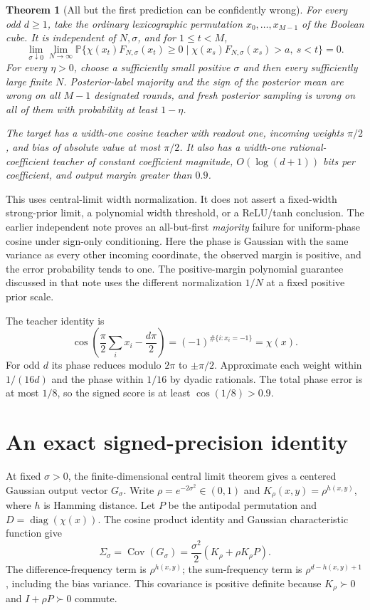 \documentclass[11pt]{article}
\newtheorem{theorem}{Theorem}
\newcommand{\Pp}{\mathbb P}\newcommand{\one}{\mathbf1}
\begin{document}
\begin{theorem}[All but the first prediction can be confidently wrong]
\label{thm:main}
For every odd $d\ge1$, take the ordinary lexicographic permutation
$x_0,\ldots,x_{M-1}$ of the Boolean cube. It is independent of
$N,\sigma$, and for $1\le t<M$,
\[
 \lim_{\sigma\downarrow0}\lim_{N\to\infty}
 \Pp\{\chi(x_t)F_{N,\sigma}(x_t)\ge0\mid
       \chi(x_s)F_{N,\sigma}(x_s)>a,\ s<t\}=0.             \tag{2}
\]
For every $\eta>0$, choose a sufficiently small positive
$\sigma$ and then every sufficiently large finite $N$.
Posterior-label majority and the sign of the posterior mean are wrong
on all $M-1$ designated rounds,
and fresh posterior sampling is wrong on all of them with probability
at least $1-\eta$.

The target has a width-one cosine teacher with readout one, incoming
weights $\pi/2$, and bias of absolute value at most $\pi/2$.
It also has a width-one rational-coefficient teacher of constant
coefficient magnitude, $O(\log(d+1))$ bits per coefficient, and output
margin greater than $0.9$.
\end{theorem}

This uses central-limit width normalization. It does not assert a
fixed-width strong-prior limit, a polynomial width threshold, or a
ReLU/tanh conclusion. The earlier independent note \cite{sign-only}
proves an all-but-first \emph{majority} failure for uniform-phase cosine
under sign-only conditioning. Here the phase is Gaussian with the same
variance as every other incoming coordinate, the observed margin is
positive, and the error probability tends to one.
The positive-margin polynomial guarantee discussed in that note uses
the different normalization $1/N$ at a fixed positive prior scale.

The teacher identity is
\[
 \cos\left(\frac\pi2\sum_i x_i-\frac{d\pi}2\right)
       =(-1)^{\#\{i:x_i=-1\}}=\chi(x).
\]
For odd $d$ its phase reduces modulo $2\pi$ to $\pm\pi/2$.
Approximate each weight within $1/(16d)$ and the phase within $1/16$
by dyadic rationals. The total phase error is at most $1/8$, so the
signed score is at least $\cos(1/8)>0.9$.

\section{An exact signed-precision identity}
At fixed $\sigma>0$, the finite-dimensional central limit theorem
gives a centered Gaussian output vector $G_\sigma$.
Write $\rho=e^{-2\sigma^2}\in(0,1)$ and
$K_\rho(x,y)=\rho^{h(x,y)}$, where $h$ is Hamming distance.
Let $P$ be the antipodal permutation and $D=\operatorname{diag}(\chi(x))$.
The cosine product identity and Gaussian characteristic function give
\[
 \Sigma_\sigma=\operatorname{Cov}(G_\sigma)
       =\frac{\sigma^2}{2}(K_\rho+\rho K_\rho P).          \tag{3}
\]
The difference-frequency term is $\rho^{h(x,y)}$; the sum-frequency
term is $\rho^{d-h(x,y)+1}$, including the bias variance.
This covariance is positive definite because $K_\rho\succ0$ and
$I+\rho P\succ0$ commute.
\end{document}
